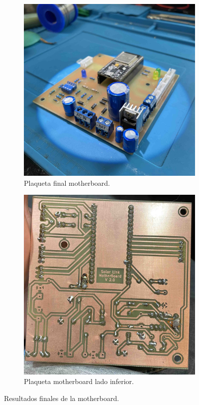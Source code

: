\begin{figure}[H]

\begin{subfigure}{0.5\textwidth}
\includegraphics[width=0.9\linewidth]{hardware/IMG_8945.jpg} 
\caption{Plaqueta final motherboard.}
\label{fig:corr-fin}
\end{subfigure}
\begin{subfigure}{0.5\textwidth}
\includegraphics[width=0.9\linewidth]{hardware/F44CD098-7B36-40C0-95DB-D5040B6878EF.JPG}
\caption{Plaqueta motherboard lado inferior.}
\label{fig:corr-pcb}
\end{subfigure}

\caption{Resultados finales de la motherboard.}
\label{fig:corriente-fin}
\end{figure}

